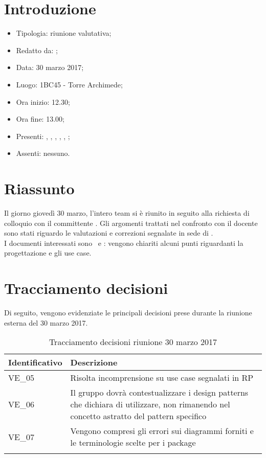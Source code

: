 \section{Introduzione}

	\begin{itemize}
		\item Tipologia: riunione valutativa;
		\item Redatto da: \AS;
		\item Data: 30 marzo 2017;
		\item Luogo: 1BC45 - Torre Archimede;
		\item Ora inizio: 12.30;
		\item Ora fine: 13.00;
		\item Presenti: \AS, \NS, \DS, \DAN, \AN, \MC;	
		\item Assenti: nessuno.
	\end{itemize}

\section{Riassunto}
Il giorno giovedì 30 marzo, l'intero team si è riunito in seguito alla richiesta di colloquio con il committente \RC. Gli argomenti trattati nel confronto con il docente sono stati riguardo le valutazioni e correzioni segnalate in sede di \RP.\\
I documenti interessati sono \ST\ e \AdR: vengono chiariti alcuni punti riguardanti la progettazione e gli use case.

\section{Tracciamento decisioni}
Di seguito, vengono evidenziate le principali decisioni prese durante la riunione esterna del 30 marzo 2017.

\begin{longtable}{|>{\centering\arraybackslash}p{4cm}|>{\centering\arraybackslash}p{9cm}|}
	\hline \rowcolor{Gray}
	\textbf{Identificativo} & \textbf{Descrizione}\\
	\hline
	\endhead
			VE\_05	& Risolta incomprensione su use case segnalati in RP \\
			\hline
			VE\_06 & Il gruppo dovrà contestualizzare i design patterns che dichiara di utilizzare, non rimanendo nel concetto astratto del pattern specifico \\
			\hline
			VE\_07 & Vengono compresi gli errori sui diagrammi forniti e le terminologie scelte per i package \\
			\hline
		\caption{Tracciamento decisioni riunione 30 marzo 2017}
\end{longtable}